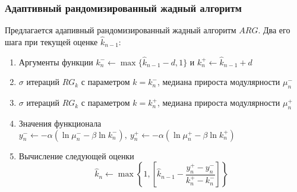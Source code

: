 \begin{frame}
	\frametitle{Адаптивный рандомизированный жадный алгоритм}

	Предлагается адапивный рандомизированный жадный алгоритм $ARG$. Два его шага при текущей оценке $\hat{k}_{n - 1}$:
	\begin{enumerate}
		\item Аргументы функции $k_{n}^{-} \leftarrow \max\{\hat{k}_{n - 1} - d, 1\}$ и $k_{n}^{+} \leftarrow \hat{k}_{n - 1} + d$
		\item $\sigma$ итераций $RG_k$ с параметром $k = k_{n}^{-}$, медиана прироста модулярности $\mu_n^{-}$
		\item $\sigma$ итераций $RG_k$ с параметром $k = k_{n}^{+}$, медиана прироста модулярности $\mu_n^{+}$
		\item Значения функционала\\
		$y_n^{-} \leftarrow -\alpha (\ln \mu_n^{-} - \beta \ln k_n^{-}),\ y_n^{+} \leftarrow -\alpha (\ln \mu_n^{+} - \beta \ln k_n^{+})$
		\item Вычисление следующей оценки
		$$\hat{k}_n \leftarrow \max\left\{1, \left[\hat{k}_{n - 1} - \frac{y_n^{+} - y_n^{-}}{k_n^{+} - k_n^{-}}\right]\right\}$$
	\end{enumerate}
\end{frame}


